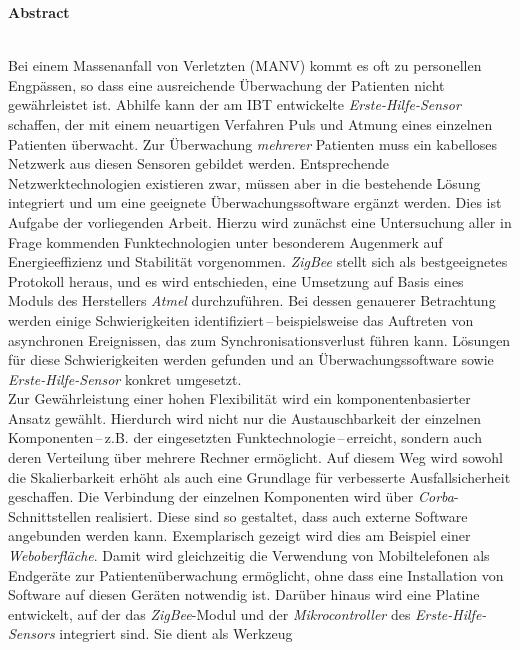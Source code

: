 \null\newpage
\Huge\textbf{Abstract}\normalsize\\\\
\vspace{-0.5cm}

\begin{small}
Bei einem Massenanfall von Verletzten (MANV) kommt es oft zu personellen Engpässen, so dass eine
ausreichende Überwachung der Patienten nicht gewährleistet ist. 
Abhilfe kann der am IBT entwickelte \emph{Erste-Hilfe-Sensor} schaffen, der mit einem neuartigen 
Verfahren Puls und Atmung eines einzelnen Patienten überwacht. Zur Überwachung \emph{mehrerer} Patienten 
muss ein kabelloses Netzwerk aus diesen Sensoren gebildet werden.
Entsprechende Netzwerktechnologien existieren zwar, müssen aber in die bestehende Lösung integriert 
und um eine geeignete Überwachungssoftware ergänzt werden. Dies ist Aufgabe der vorliegenden Arbeit.
Hierzu wird zunächst eine Untersuchung aller in Frage kommenden Funktechnologien unter besonderem 
Augenmerk auf Energieeffizienz und Stabilität vorgenommen.
\emph{ZigBee} stellt sich als bestgeeignetes Protokoll heraus, und es wird entschieden,
eine Umsetzung auf Basis eines Moduls des Herstellers \emph{Atmel} durchzuführen. 
Bei dessen genauerer Betrachtung werden einige Schwierigkeiten 
identifiziert\,--\,beispielsweise das Auftreten von asynchronen Ereignissen, das zum 
Synchronisationsverlust führen kann.
Lösungen für diese Schwierigkeiten werden gefunden und an Überwachungssoftware sowie \emph{Erste-Hilfe-Sensor} 
konkret umgesetzt.
\\                    
Zur Gewährleistung einer hohen Flexibilität wird ein komponentenbasierter Ansatz gewählt. 
Hierdurch wird nicht nur die Austauschbarkeit der einzelnen Komponenten\,--\,z.B. der eingesetzten
Funktechnologie\,--\,erreicht, sondern auch deren Verteilung über mehrere Rechner ermöglicht. 
Auf diesem Weg wird sowohl die Skalierbarkeit erhöht als auch eine Grundlage für verbesserte
Ausfallsicherheit geschaffen.
Die Verbindung der einzelnen Komponenten wird über \emph{Corba}-Schnittstellen realisiert. 
Diese sind so gestaltet, dass auch externe Software angebunden werden kann. Exemplarisch gezeigt wird dies
am Beispiel einer \emph{Weboberfläche}. Damit wird gleichzeitig die Verwendung von Mobiltelefonen
als Endgeräte zur Patientenüberwachung ermöglicht, ohne dass eine Installation von Software auf diesen Geräten
notwendig ist.
Darüber hinaus wird eine Platine entwickelt, auf der das \emph{ZigBee}-Modul und der
\emph{Mikrocontroller} des \emph{Erste-Hilfe-Sensors} integriert sind. Sie dient als Werkzeug

\end{small}
